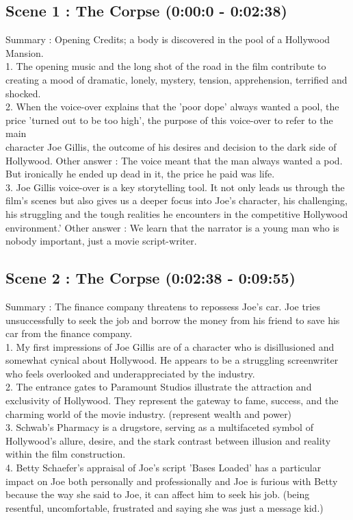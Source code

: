 \documentclass[a4paper]{article}
\begin{document}
\subsection{Scene 1 : The Corpse (0:00:0 - 0:02:38)}
Summary : Opening Credits; a body is discovered in the pool of a Hollywood Mansion.\\
1. The opening music and the long shot of the road in the film contribute to creating a mood of dramatic, lonely, mystery, tension, apprehension, terrified and shocked.\\
2. When the voice-over explains that the 'poor dope' always wanted a pool, the price 'turned out to be too high', the purpose of this voice-over to refer to the main\\
character Joe Gillis, the outcome of his desires and decision to the dark side of Hollywood. Other answer : The voice meant that the man always wanted a pod. But ironically he ended up dead in it, the price he paid was life.\\
3. Joe Gillis voice-over is a key storytelling tool. It not only leads us through the film's scenes but also gives us a deeper focus into Joe's character, his challenging, his struggling and the tough realities he encounters in the competitive Hollywood environment.' Other answer : We learn that the narrator is a young man who is nobody important, just a movie script-writer.\\

\subsection{Scene 2 : The Corpse (0:02:38 - 0:09:55)}
Summary : The finance company threatens to repossess Joe’s car. Joe tries unsuccessfully
to seek the job and borrow the money from his friend to save his car from the finance
company.\\
1. My first impressions of Joe Gillis are of a character who is disillusioned and
somewhat cynical about Hollywood. He appears to be a struggling screenwriter who
feels overlooked and underappreciated by the industry.\\
2. The entrance gates to Paramount Studios illustrate the attraction and exclusivity of
Hollywood. They represent the gateway to fame, success, and the charming world of
the movie industry. (represent wealth and power)\\
3. Schwab's Pharmacy is a drugstore, serving as a multifaceted symbol of Hollywood's
allure, desire, and the stark contrast between illusion and reality within the film
construction.\\
4. Betty Schaefer's appraisal of Joe's script 'Bases Loaded' has a particular impact on
Joe both personally and professionally and Joe is furious with Betty because the way
she said to Joe, it can affect him to seek his job. (being resentful, uncomfortable,
frustrated and saying she was just a message kid.)\\
\end{document}
